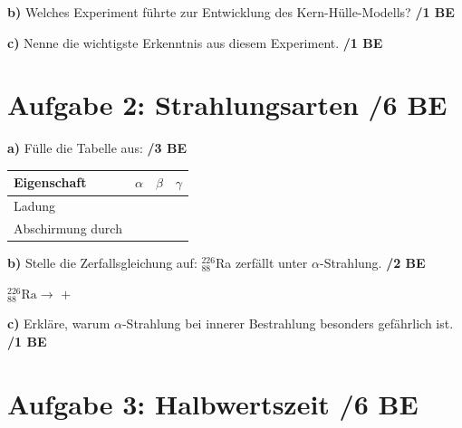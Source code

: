 \documentclass[11pt,a4paper]{article}
\newcommand{\punkte}[1]{\hfill\textbf{/#1 BE}}
\newcommand{\antwortzeile}{\vspace{0.5cm}\hrulefill\par}
\begin{document}
\vspace{0.5cm}

\textbf{b)} Welches Experiment führte zur Entwicklung des Kern-Hülle-Modells? \punkte{1}

\antwortzeile

\vspace{0.3cm}

\textbf{c)} Nenne die wichtigste Erkenntnis aus diesem Experiment. \punkte{1}

\antwortzeile

\vspace{0.5cm}

\section*{Aufgabe 2: Strahlungsarten \punkte{6}}

\textbf{a)} Fülle die Tabelle aus: \punkte{3}

\begin{center}
\begin{tabular}{|p{3cm}|p{2.5cm}|p{2.5cm}|p{2.5cm}|}
\hline
\textbf{Eigenschaft} & $\alpha$ & $\beta$ & $\gamma$ \\
\hline
Ladung & & & \\[0.8cm]
\hline
Abschirmung durch & & & \\[0.8cm]
\hline
\end{tabular}
\end{center}

\vspace{0.3cm}

\textbf{b)} Stelle die Zerfallsgleichung auf: ${}^{226}_{88}$Ra zerfällt unter $\alpha$-Strahlung. \punkte{2}

\vspace{1cm}
\begin{center}
${}^{226}_{88}\text{Ra} \longrightarrow$ \hrulefill $+$ \hrulefill
\end{center}

\vspace{0.3cm}

\textbf{c)} Erkläre, warum $\alpha$-Strahlung bei innerer Bestrahlung besonders gefährlich ist. \punkte{1}

\antwortzeile

\vspace{0.5cm}

\section*{Aufgabe 3: Halbwertszeit \punkte{6}}
\end{document}

